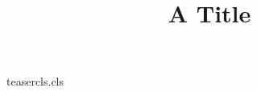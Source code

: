 \begin{filecontents*}[force]{teasercls.cls}
\RequirePackage{ifthen}
\def\authors#1{\def\@authors{#1}}
\def\affiliations#1{\def\@affiliations{#1}}
\renewcommand{\maketitle}{{\@title\par}{\@authors\par}{\@affiliations\par}\ifthenelse{\boolean{teaser}}{\@teaserfig}{}}
\end{filecontents*}
\documentclass{teasercls}
\title{A Title}
\maketitle
Body text.

